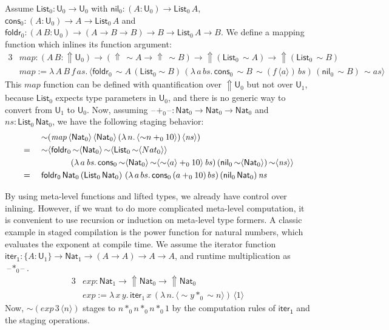 \documentclass[acmsmall,screen]{acmart}
\newcommand{\mit}[1]{\mathit{#1}}
\newcommand{\msf}[1]{\mathsf{#1}}
\newcommand{\Lift}{{\Uparrow}}
\newcommand{\spl}{{\sim}}
\newcommand{\qut}[1]{\langle #1\rangle}
\newcommand{\U}{\msf{U}}
\newcommand{\List}{\msf{List}}
\newcommand{\nil}{\msf{nil}}
\newcommand{\cons}{\msf{cons}}
\newcommand{\Nat}{\msf{Nat}}
\newcommand{\blank}{{\mathord{\hspace{1pt}\text{--}\hspace{1pt}}}}
\theoremstyle{remark}
\begin{document}
Assume $\List_0 : \U_0 \to \U_0$ with $\nil_0 : (A : \U_0) \to \List_0\,A$,
$\cons_0 : (A : \U_0) \to A \to \List_0\,A$ and $\msf{foldr}_0 : (A\,B : \U_0)
\to (A \to B \to B) \to B \to \List_0\,A \to B$. We define a mapping function which
inlines its function argument:
\begin{alignat*}{3}
  & \mit{map} : (A\,B : \Lift\U_0) \to (\Lift\,\spl A \to \Lift\,\spl B)
      \to \Lift(\List_0\,\spl A) \to \Lift(\List_0\,\spl B)\\
  & \mit{map} := \lambda\,A\,B\,f\,\mit{as}.\,
      \qut{\msf{foldr}_0\,
        \spl A\,(\List_0 \spl B)\,
        (\lambda\,a\,\mit{bs}.\, \cons_0\,\spl B\,\spl(f\,\qut{a})\,\mit{bs})\,
        (\nil_0\,\spl B)\,
        \spl as
        }
\end{alignat*}
This $\mit{map}$ function can be defined with quantification over $\Lift \U_0$ but not
over $\U_1$, because $\List_0$ expects type parameters in $\U_0$, and there is
no generic way to convert from $\U_1$ to $\U_0$. Now, assuming
$\blank\!+_0\!\blank : \Nat_0 \to \Nat_0 \to \Nat_0$ and $\mit{ns} :
\List_0\,\Nat_0$, we have the following staging behavior:
\begin{alignat*}{3}
  & &&\spl(\mit{map}\,\qut{\Nat_0}\,\qut{\Nat_0}\,(\lambda\,n.\,\qut{\spl n +_0 10})\,\qut{\mit{ns}})\\
  & =\hspace{0.3em}&&\spl\qut{\msf{foldr}_0\,
        \spl \qut{\Nat_0}\,\spl \qut{\List_0\,\spl\qut{Nat_0}}\\
  & && \hspace{3.5em}(\lambda\,a\,\mit{bs}.\, \cons_0\,\spl\qut{\Nat_0}\,\spl\qut{\spl\qut{a} +_0 10}\,\mit{bs})\,
        (\nil_0\,\spl \qut{\Nat_0})\,
        \spl\qut{\mit{ns}}}\\
  & =\hspace{0.3em} &&\msf{foldr_0}\,\Nat_0\,(\List_0\,\Nat_0)\,\,(\lambda\,a\,bs.\,\cons_0\,(a +_0 10)\,bs)\,(\nil_0\,\Nat_0)\,\mit{ns}
\end{alignat*}

By using meta-level functions and lifted types, we already have control over
inlining. However, if we want to do more complicated meta-level computation, it
is convenient to use recursion or induction on meta-level type formers. A
classic example in staged compilation is the power function for natural numbers,
which evaluates the exponent at compile time. We assume the iterator function
$\msf{iter_1} : \{A : \U_1\} \to \Nat_1 \to (A \to A) \to A \to A$, and runtime
multiplication as $\blank\!*_0\!\blank$.
\begin{alignat*}{3}
  &\mit{exp} : \Nat_1 \to \Lift \Nat_0 \to \Lift \Nat_0 \\
  &\mit{exp} := \lambda\,x\,y.\,
  \msf{iter}_1\,x\,(\lambda\,n.\,\qut{\spl y *_0 \spl n})\,\qut{1}
\end{alignat*}
Now, $\spl(\mit{exp}\,3\,\qut{n})$ stages to $n *_0 n *_0 n *_0 1$ by the computation rules
of $\msf{iter_1}$ and the staging operations.
\end{document}
